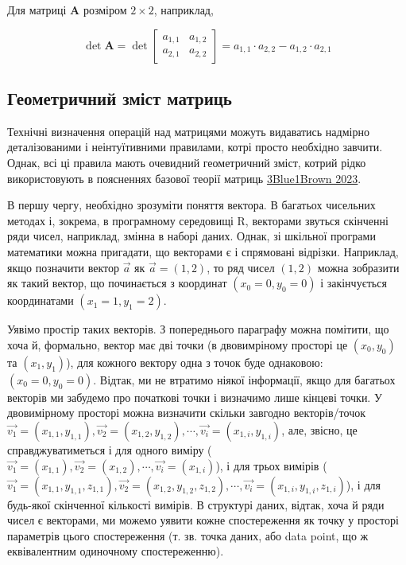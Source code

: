 \documentclass[
  11pt,
]{book}
\begin{document}
Для матриці \(\mathbf{A}\) розміром \(2 \times 2\), наприклад,

\[\det \mathbf{A} = \det \begin{bmatrix}
a_{1, 1} & a_{1, 2} \\
a_{2, 1} & a_{2, 2}
\end{bmatrix} = a_{1, 1} \cdot a_{2, 2} - a_{1, 2} \cdot a_{2, 1}\]

\subsection{Геометричний зміст матриць}\label{matrices_art}

Технічні визначення операцій над матрицями можуть видаватись надмірно
деталізованими і неінтуїтивними правилами, котрі просто необхідно
завчити. Однак, всі ці правила мають очевидний геометричний зміст,
котрий рідко використовують в поясненнях базової теорії матриць
\href{https://youtube.com/playlist?list=PLZHQObOWTQDPD3MizzM2xVFitgF8hE_ab}{3Blue1Brown
2023}.

В першу чергу, необхідно зрозуміти поняття вектора. В багатьох чисельних
методах і, зокрема, в програмному середовищі R, векторами звуться
скінченні ряди чисел, наприклад, змінна в наборі даних. Однак, зі
шкільної програми математики можна пригадати, що векторами є і
спрямовані відрізки. Наприклад, якщо позначити вектор \(\vec{a}\) як
\(\vec{a} = (1, 2)\), то ряд чисел \((1, 2)\) можна зобразити як такий
вектор, що починається з координат \((x_0 = 0, y_0 = 0)\) і закінчується
координатами \((x_1 = 1, y_1 = 2)\).

Уявімо простір таких векторів. З попереднього параграфу можна помітити,
що хоча й, формально, вектор має дві точки (в двовимріному просторі це
\((x_0, y_0)\) та \((x_1, y_1)\)), для кожного вектору одна з точок буде
однаковою: \((x_0 = 0, y_0 = 0)\). Відтак, ми не втратимо ніякої
інформації, якщо для багатьох векторів ми забудемо про початкові точки і
визначимо лише кінцеві точки. У двовимірному просторі можна визначити
скільки завгодно векторів/точок
\(\vec{v_1} = (x_{1, 1}, y_{1, 1}), \vec{v_2} = (x_{1, 2}, y_{1, 2}), \cdots, \vec{v_i} = (x_{1, i}, y_{1, i})\),
але, звісно, це справджуватиметься і для одного виміру
(\(\vec{v_1} = (x_{1, 1}), \vec{v_2} = (x_{1, 2}), \cdots, \vec{v_i} = (x_{1, i})\)),
і для трьох вимірів
(\(\vec{v_1} = (x_{1, 1}, y_{1, 1}, z_{1, 1}), \vec{v_2} = (x_{1, 2}, y_{1, 2}, z_{1, 2}), \cdots, \vec{v_i} = (x_{1, i}, y_{1, i}, z_{1, i})\)),
і для будь-якої скінченної кількості вимірів. В структурі даних, відтак,
хоча й ряди чисел є векторами, ми можемо уявити кожне спостереження як
точку у просторі параметрів цього спостереження (т. зв. точка даних, або
data point, що ж еквівалентним одиночному спостереженню).
\end{document}

